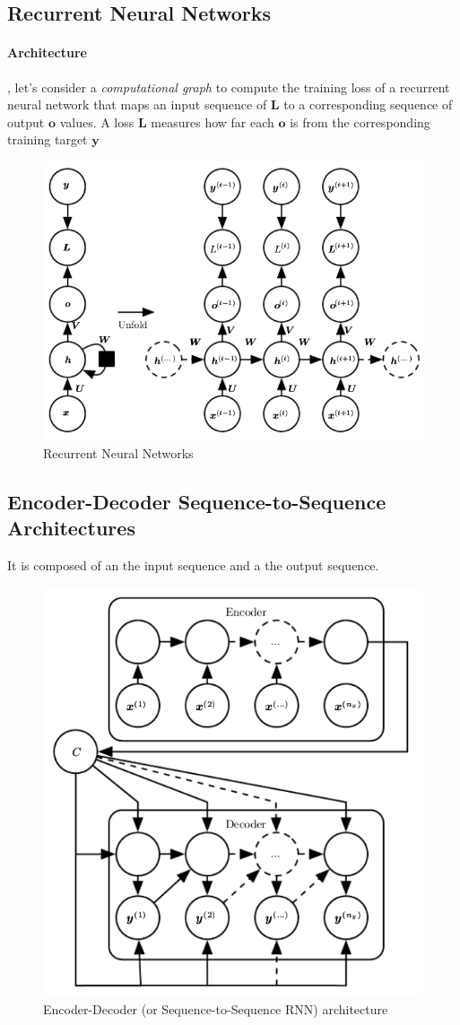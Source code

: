 \subsection{Recurrent Neural Networks}
\paragraph{Architecture}, let's consider a \emph{computational graph} to compute the
training loss of a recurrent neural network that maps an input sequence of $\bm{L}$ to 
a corresponding sequence of output $\bm{o}$ values. A loss $\bm{L}$ measures how far each
$\bm{o}$ is from the corresponding  training target $\bm{y}$
\begin{figure}[H]
    \begin{center}
        \includegraphics[width=.5\textwidth]{chapters/4_deep_learning/3_types_of_neural_networks/images/03_rnn.png}
    \end{center}
    \caption{Recurrent Neural Networks}
    \label{fig:03_rnn}
\end{figure}


\subsection{Encoder-Decoder Sequence-to-Sequence Architectures}

It is composed of an  the input sequence and a  the output sequence.
\begin{figure}[H]
    \begin{center}
        \includegraphics[width=.5\textwidth]{chapters/4_deep_learning/3_types_of_neural_networks/images/03_encoder_decoder_architecture.png}
    \end{center}
    \caption{Encoder-Decoder (or Sequence-to-Sequence RNN) architecture}
    \label{fig:03_encoder_decoder_architecture}
\end{figure}

